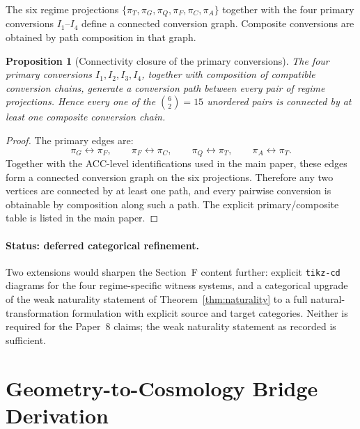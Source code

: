 \documentclass[11pt]{article}
\theoremstyle{plain}
\newtheorem{proposition}[theorem]{Proposition}
\theoremstyle{definition}
\theoremstyle{remark}
\begin{document}
The six regime projections $\{\pi_T, \pi_G, \pi_Q, \pi_F, \pi_C, \pi_A\}$ together with the four primary conversions $I_1$--$I_4$ define a connected conversion graph.  Composite conversions are obtained by path composition in that graph.

\begin{proposition}[Connectivity closure of the primary conversions]\label{prop:groupoid_closure}
The four primary conversions $I_1, I_2, I_3, I_4$, together with composition of compatible conversion chains, generate a conversion path between every pair of regime projections.  Hence every one of the $\binom{6}{2} = 15$ unordered pairs is connected by at least one composite conversion chain.
\end{proposition}

\begin{proof}
The primary edges are:
\[
  \pi_G \leftrightarrow \pi_F,\qquad
  \pi_F \leftrightarrow \pi_C,\qquad
  \pi_Q \leftrightarrow \pi_T,\qquad
  \pi_A \leftrightarrow \pi_T.
\]
Together with the ACC-level identifications used in the main paper, these edges form a connected conversion graph on the six projections.  Therefore any two vertices are connected by at least one path, and every pairwise conversion is obtainable by composition along such a path.  The explicit primary/composite table is listed in the main paper.
\end{proof}

\paragraph{Status: deferred categorical refinement.}  Two extensions would sharpen the Section~F content further:  explicit \texttt{tikz-cd} diagrams for the four regime-specific witness systems, and a categorical upgrade of the weak naturality statement of Theorem~\ref{thm:naturality} to a full natural-transformation formulation with explicit source and target categories.  Neither is required for the Paper~8 claims; the weak naturality statement as recorded is sufficient.

\section{Geometry-to-Cosmology Bridge Derivation}\label{supp:G}
\end{document}

